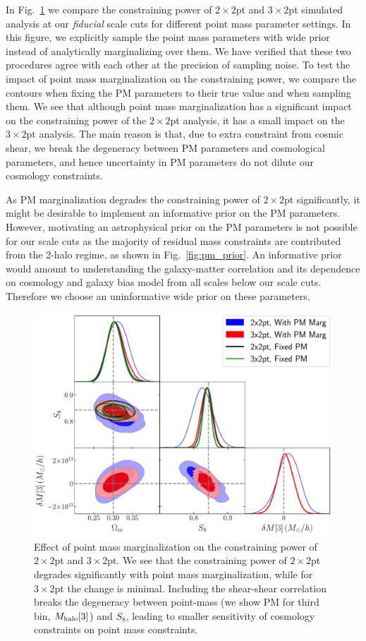 \documentclass[fleqn,usenatbib]{mnras}
\begin{document}
In Fig.~\ref{fig:pm_effect} we compare the constraining power of $2\times2$pt and $3\times2$pt simulated analysis at our \textit{fiducial} scale cuts for different point mass parameter settings. In this figure, we explicitly sample the point mass parameters with wide prior instead of analytically marginalizing over them. We have verified that these two procedures agree with each other at the precision of sampling noise. To test the impact of point mass marginalization on the constraining power, we compare the contours when fixing the PM parameters to their true value and when sampling them. We see that although point mass marginalization has a significant impact on the constraining power of the $2\times2$pt analysis, it has a small impact on the $3\times2$pt analysis. The main reason is that, due to extra constraint from cosmic shear, we break the degeneracy between PM parameters and cosmological parameters, and hence uncertainty in PM parameters do not dilute our cosmology constraints. 


As PM marginalization degrades the constraining power of $2\times2$pt significantly, it might be desirable to implement an informative prior on the PM parameters. However, motivating an astrophysical prior on the PM parameters is not possible for our scale cuts as the majority of residual mass constraints are contributed from the 2-halo regime, as shown in Fig.~\ref{fig:pm_prior}. An informative prior would amount to understanding the galaxy-matter correlation and its dependence on cosmology and galaxy bias model from all scales below our scale cuts. Therefore we choose an uninformative wide prior on these parameters. 

\begin{figure}
\includegraphics[width=\columnwidth]{figs/PM_constraints_2x2pt_3x2pt.pdf}
\caption[]{Effect of point mass marginalization on the constraining power of $2\times2$pt and $3\times2$pt. We see that the constraining power of $2\times2$pt degrades significantly with point mass marginalization, while for $3\times2$pt the change is minimal. Including the shear-shear correlation  breaks the degeneracy between point-mass (we show PM for third bin, $M_{\rm halo}[3]$) and $S_8$, leading to smaller sensitivity of cosmology constraints on point mass constraints. }
\label{fig:pm_effect}
\end{figure}
\end{document}
